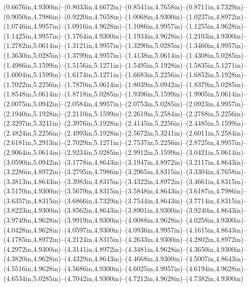 (0.6676in,4.9300in)--(0.8033in,4.6672in)--(0.8541in,4.7658in)--(0.8711in,4.7329in)--(0.9050in,4.7986in)--(0.9220in,4.7658in)--(1.0068in,4.9300in)--(1.0237in,4.8972in)--(1.0746in,4.9957in)--(1.0916in,4.9628in)--(1.1086in,4.9957in)--(1.1255in,4.9628in)--(1.1425in,4.9957in)--(1.1764in,4.9300in)--(1.1934in,4.9628in)--(1.2103in,4.9300in)--(1.2782in,5.0614in)--(1.3121in,4.9957in)--(1.3290in,5.0285in)--(1.3460in,4.9957in)--(1.3630in,5.0285in)--(1.3799in,4.9957in)--(1.4138in,5.0614in)--(1.4308in,5.0285in)--(1.4986in,5.1599in)--(1.5156in,5.1271in)--(1.5495in,5.1928in)--(1.5835in,5.1271in)--(1.6004in,5.1599in)--(1.6174in,5.1271in)--(1.6683in,5.2256in)--(1.6852in,5.1928in)--(1.7022in,5.2256in)--(1.7870in,5.0614in)--(1.8039in,5.0942in)--(1.8379in,5.0285in)--(1.8548in,5.0614in)--(1.8718in,5.0285in)--(1.9396in,5.1599in)--(1.9905in,5.0614in)--(2.0075in,5.0942in)--(2.0584in,4.9957in)--(2.0753in,5.0285in)--(2.0923in,4.9957in)--(2.1940in,5.1928in)--(2.2110in,5.1599in)--(2.2619in,5.2584in)--(2.2788in,5.2256in)--(2.3297in,5.3241in)--(2.3976in,5.1928in)--(2.4145in,5.2256in)--(2.4485in,5.1599in)--(2.4824in,5.2256in)--(2.4993in,5.1928in)--(2.5672in,5.3241in)--(2.6011in,5.2584in)--(2.6181in,5.2913in)--(2.7029in,5.1271in)--(2.7537in,5.2256in)--(2.8725in,4.9957in)--(2.9064in,5.0614in)--(2.9234in,5.0285in)--(2.9912in,5.1599in)--(3.0421in,5.0614in)--(3.0590in,5.0942in)--(3.1778in,4.8643in)--(3.1947in,4.8972in)--(3.2117in,4.8643in)--(3.2286in,4.8972in)--(3.2795in,4.7986in)--(3.2965in,4.8315in)--(3.3304in,4.7658in)--(3.3813in,4.8643in)--(3.3983in,4.8315in)--(3.4322in,4.8972in)--(3.4661in,4.8315in)--(3.5170in,4.9300in)--(3.5679in,4.8315in)--(3.5848in,4.8643in)--(3.6187in,4.7986in)--(3.6357in,4.8315in)--(3.6866in,4.7329in)--(3.7544in,4.8643in)--(3.7714in,4.8315in)--(3.8223in,4.9300in)--(3.8562in,4.8643in)--(3.8901in,4.9300in)--(3.9240in,4.8643in)--(3.9749in,4.9628in)--(3.9919in,4.9300in)--(4.0088in,4.9628in)--(4.0258in,4.9300in)--(4.0428in,4.9628in)--(4.0597in,4.9300in)--(4.0936in,4.9957in)--(4.1615in,4.8643in)--(4.1785in,4.8972in)--(4.2124in,4.8315in)--(4.2633in,4.9300in)--(4.2802in,4.8972in)--(4.2972in,4.9300in)--(4.3141in,4.8972in)--(4.3481in,4.9628in)--(4.3650in,4.9300in)--(4.3820in,4.9628in)--(4.4329in,4.8643in)--(4.4668in,4.9300in)--(4.5007in,4.8643in)--(4.5516in,4.9628in)--(4.5686in,4.9300in)--(4.6025in,4.9957in)--(4.6194in,4.9628in)--(4.6534in,5.0285in)--(4.7042in,4.9300in)--(4.7212in,4.9628in)--(4.7382in,4.9300in)
